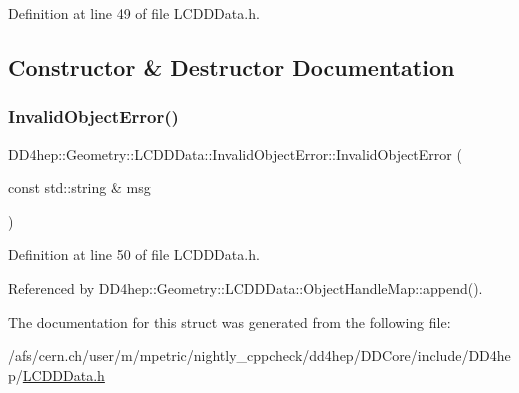 Definition at line 49 of file L\+C\+D\+D\+Data.\+h.



\subsection{Constructor \& Destructor Documentation}
\hypertarget{struct_d_d4hep_1_1_geometry_1_1_l_c_d_d_data_1_1_invalid_object_error_aaca6af4a0b1d636f7af31f3191f1d998}{}\label{struct_d_d4hep_1_1_geometry_1_1_l_c_d_d_data_1_1_invalid_object_error_aaca6af4a0b1d636f7af31f3191f1d998} 
\subsubsection{\texorpdfstring{Invalid\+Object\+Error()}{InvalidObjectError()}}
{\footnotesize\ttfamily D\+D4hep\+::\+Geometry\+::\+L\+C\+D\+D\+Data\+::\+Invalid\+Object\+Error\+::\+Invalid\+Object\+Error (\begin{DoxyParamCaption}\item[{const std\+::string \&}]{msg }\end{DoxyParamCaption})\hspace{0.3cm}{\ttfamily [inline]}}



Definition at line 50 of file L\+C\+D\+D\+Data.\+h.



Referenced by D\+D4hep\+::\+Geometry\+::\+L\+C\+D\+D\+Data\+::\+Object\+Handle\+Map\+::append().



The documentation for this struct was generated from the following file\+:\begin{DoxyCompactItemize}
\item 
/afs/cern.\+ch/user/m/mpetric/nightly\+\_\+cppcheck/dd4hep/\+D\+D\+Core/include/\+D\+D4hep/\hyperlink{_l_c_d_d_data_8h}{L\+C\+D\+D\+Data.\+h}\end{DoxyCompactItemize}
